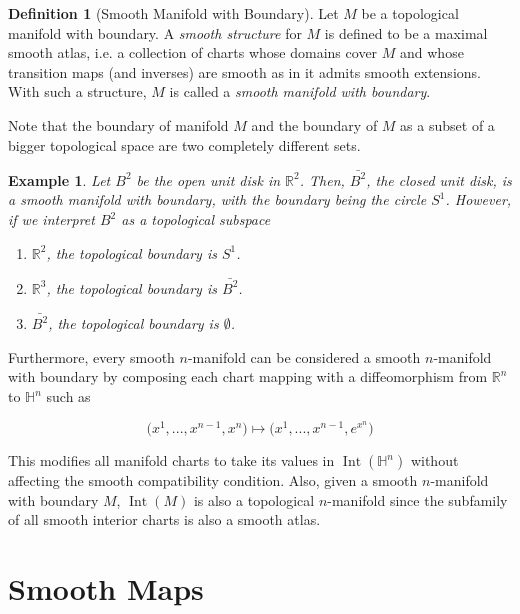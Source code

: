 \documentclass{article}
\DeclareMathOperator{\Int}{Int}
\newtheorem{example}{Example}[section]
\theoremstyle{remark}
\theoremstyle{definition}
\newtheorem{definition}{Definition}[section]
\begin{document}
    \begin{definition}[Smooth Manifold with Boundary]
      Let $M$ be a topological manifold with boundary. A \textit{smooth structure} for $M$ is defined to be a maximal smooth atlas, i.e. a collection of charts whose domains cover $M$ and whose transition maps (and inverses) are smooth as in it admits smooth extensions. With such a structure, $M$ is called a \textit{smooth manifold with boundary}. 
    \end{definition}

    Note that the boundary of manifold $M$ and the boundary of $M$ as a subset of a bigger topological space are two completely different sets. 

    \begin{example}
      Let $B^2$ be the open unit disk in $\mathbb{R}^2$. Then, $\bar{B^2}$, the closed unit disk, is a smooth manifold with boundary, with the boundary being the circle $S^1$. However, if we interpret $B^2$ as a topological subspace 
      \begin{enumerate}
        \item $\mathbb{R}^2$, the topological boundary is $S^1$. 
        \item $\mathbb{R}^3$, the topological boundary is $\bar{B^2}$. 
        \item $\bar{B^2}$, the topological boundary is $\emptyset$. 
      \end{enumerate}
    \end{example}

    Furthermore, every smooth $n$-manifold can be considered a smooth $n$-manifold with boundary by composing each chart mapping with a diffeomorphism from $\mathbb{R}^n$ to $\mathbb{H}^n$ such as

      \[\big(x^1, ..., x^{n-1}, x^n \big) \mapsto \big( x^1, ..., x^{n-1}, e^{x^n} \big)\]

    This modifies all manifold charts to take its values in $\Int(\mathbb{H}^n)$ without affecting the smooth compatibility condition. 
    Also, given a smooth $n$-manifold with boundary $M$, $\Int(M)$ is also a topological $n$-manifold since the subfamily of all smooth interior charts is also a smooth atlas. 

\section{Smooth Maps}
\end{document}
